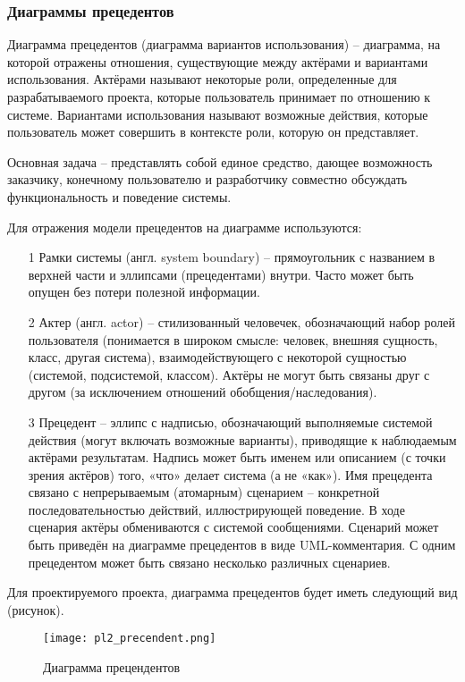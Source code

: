 \subsubsection{Диаграммы прецедентов}

Диаграмма прецедентов (диаграмма вариантов использования) – диаграмма, на которой отражены отношения, существующие между актёрами и вариантами использования. Актёрами называют некоторые роли, определенные для разрабатываемого проекта, которые пользователь принимает по отношению к системе. Вариантами использования называют возможные действия, которые пользователь может совершить в контексте роли, которую он представляет.

Основная задача – представлять собой единое средство, дающее возможность заказчику, конечному пользователю и разработчику совместно обсуждать функциональность и поведение системы.

Для отражения модели прецедентов на диаграмме используются:
\begin{enumerate}
	\item[1] Рамки системы (англ. system boundary) – прямоугольник с названием в верхней части и эллипсами (прецедентами) внутри. Часто может быть опущен без потери полезной информации.
	\item[2] Актер (англ. actor) – стилизованный человечек, обозначающий набор ролей пользователя (понимается в широком смысле: человек, внешняя сущность, класс, другая система), взаимодействующего с некоторой сущностью (системой, подсистемой, классом). Актёры не могут быть связаны друг с другом (за исключением отношений обобщения/наследования).
	\item[3] Прецедент – эллипс с надписью, обозначающий выполняемые системой действия (могут включать возможные варианты), приводящие к наблюдаемым актёрами результатам. Надпись может быть именем или описанием (с точки зрения актёров) того, «что» делает система (а не «как»). Имя прецедента связано с непрерываемым (атомарным) сценарием – конкретной последовательностью действий, иллюстрирующей поведение. В ходе сценария актёры обмениваются с системой сообщениями. Сценарий может быть приведён на диаграмме прецедентов в виде UML-комментария. С одним прецедентом может быть связано несколько различных сценариев.
\end{enumerate}

Для проектируемого проекта, диаграмма прецедентов будет иметь следующий вид (рисунок).

\begin{figure}[h!]
	\centering
	\texttt{[image: pl2\_precendent.png]}
	\caption{Диаграмма прецендентов}
\end{figure}

